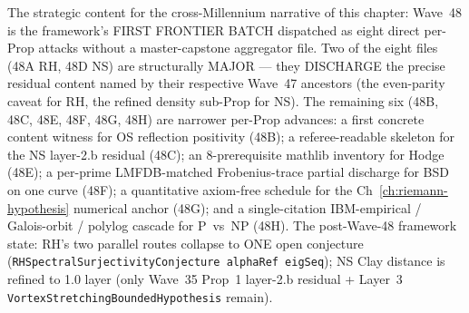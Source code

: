 \begin{remark}
\begin{itemize}
\end{itemize}
The strategic content for the cross-Millennium narrative of this chapter: Wave~48 is the framework's FIRST FRONTIER BATCH dispatched as eight direct per-Prop attacks without a master-capstone aggregator file. Two of the eight files (48A RH, 48D NS) are structurally MAJOR --- they DISCHARGE the precise residual content named by their respective Wave~47 ancestors (the even-parity caveat for RH, the refined density sub-Prop for NS). The remaining six (48B, 48C, 48E, 48F, 48G, 48H) are narrower per-Prop advances: a first concrete content witness for OS reflection positivity (48B); a referee-readable skeleton for the NS layer-2.b residual (48C); an 8-prerequisite mathlib inventory for Hodge (48E); a per-prime LMFDB-matched Frobenius-trace partial discharge for BSD on one curve (48F); a quantitative axiom-free schedule for the Ch~\ref{ch:riemann-hypothesis} numerical anchor (48G); and a single-citation IBM-empirical / Galois-orbit / polylog cascade for P~vs~NP (48H). The post-Wave-48 framework state: RH's two parallel routes collapse to ONE open conjecture (\texttt{RHSpectralSurjectivityConjecture alphaRef eigSeq}); NS Clay distance is refined to 1.0 layer (only Wave~35 Prop~1 layer-2.b residual + Layer~3 \texttt{VortexStretchingBoundedHypothesis} remain).


\end{remark}
